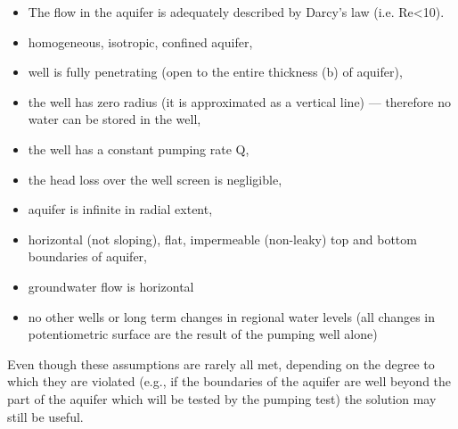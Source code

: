 \begin{itemize}
\item The flow in the aquifer is adequately described by Darcy's law (i.e. Re<10).
\end{itemize}
\begin{itemize}
\item homogeneous, isotropic, confined aquifer,
\end{itemize}
\begin{itemize}
\item well is fully penetrating (open to the entire thickness (b) of aquifer),
\end{itemize}
\begin{itemize}
\item the well has zero radius (it is approximated as a vertical line) — therefore no water can be stored in the well,
\end{itemize}
\begin{itemize}
\item the well has a constant pumping rate Q,
\end{itemize}
\begin{itemize}
\item the head loss over the well screen is negligible,
\end{itemize}
\begin{itemize}
\item aquifer is infinite in radial extent,
\end{itemize}
\begin{itemize}
\item horizontal (not sloping), flat, impermeable (non-leaky) top and bottom boundaries of aquifer,
\end{itemize}
\begin{itemize}
\item groundwater flow is horizontal
\end{itemize}
\begin{itemize}
\item no other wells or long term changes in regional water levels (all changes in potentiometric surface are the result of the pumping well alone)
\end{itemize}
\begin{itemize}
\end{itemize}

Even though these assumptions are rarely all met, depending on the degree to which they are violated (e.g., if the boundaries of the aquifer are well beyond the part of the aquifer which will be tested by the pumping test) the solution may still be useful.






